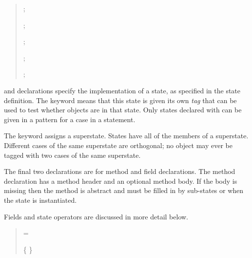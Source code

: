 \begin{quote}

 {}

 {}


 {}    
           \opt{;}

  {}    
           \opt{;}

 {}  ;

 {}  

 {}  ;

 {}  ;



 {}  ;

 {}    ;

\end{quote}

 and  declarations specify the implementation of a state,
as specified in the state definition. The  keyword means that this state is given its
own \textit{tag} that can be used to test whether objects are in that state.  Only states declared with  can be given in a pattern for a case in a  statement.

The   keyword assigns a superstate. States have 
all of the members of a superstate. Different cases of the same superstate 
are orthogonal; no object may ever be tagged with two cases of the same superstate.

The final two declarations are for method and field declarations.  The
method declaration has a method header and an
optional method body.  If the body is missing then
the method is abstract and must be filled in by sub-states or when the
state is instantiated.

Fields and state operators are discussed in more detail below.

\begin{quote}


 = 

 \{  \}

\end{quote}

